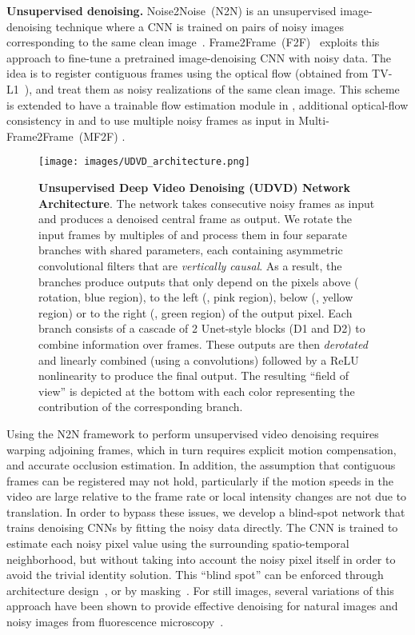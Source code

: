 \documentclass[final]{cvpr}
\begin{document}
\noindent \textbf{Unsupervised denoising.} Noise2Noise~(N2N) is an unsupervised image-denoising technique where a CNN is trained on pairs of noisy images corresponding to the same clean image~\cite{n2n}. Frame2Frame~(F2F)~\cite{f2f} exploits this approach to fine-tune a pretrained image-denoising CNN with noisy data. The idea is to register contiguous frames using the optical flow (obtained from TV-L1~\cite{tvl1}), and treat them as noisy realizations of the same clean image. This scheme is extended to have a trainable flow estimation module in \cite{Yu_2020_CVPR_Workshops}, additional optical-flow consistency in \cite{F2F_extension} and to use multiple noisy frames as input in Multi-Frame2Frame~(MF2F) \cite{mf2f}.


\begin{figure*}[ht]
\begin{center}
    \texttt{[image: images/UDVD\_architecture.png]}
\end{center}
\caption{\textbf{Unsupervised Deep Video Denoising (UDVD) Network Architecture}. The network takes  consecutive noisy frames as input and produces a denoised central frame as output. We rotate the input frames by multiples of  and process them in four separate branches with shared parameters, each containing asymmetric convolutional filters that are \emph{vertically causal}. As a result, the branches produce outputs that only depend on the pixels above ( rotation, blue region), to the left (, pink region), below (, yellow region) or to the right (, green region) of the output pixel. 
Each branch consists of a cascade of 2 Unet-style blocks (D1 and D2) to combine information over frames. These outputs are then \emph{derotated} and linearly combined (using a   convolutions) followed by a ReLU nonlinearity to produce the final output. The resulting ``field of view'' is depicted at the bottom with each color representing the contribution of the corresponding branch.}
\label{fig:network_arch}
\end{figure*}


Using the N2N framework to perform unsupervised video denoising requires warping adjoining frames, which in turn requires explicit motion compensation, and accurate occlusion estimation. In addition, the assumption that contiguous frames can be registered may not hold, particularly if the motion speeds in the video are large relative to the frame rate or local intensity changes are not due to translation. In order to bypass these issues, we develop a blind-spot network that trains denoising CNNs by fitting the noisy data directly. The CNN is trained to estimate each noisy pixel value using the surrounding spatio-temporal neighborhood, but without taking into account the noisy pixel itself in order to avoid the trivial identity solution. This ``blind spot'' can be enforced through architecture design~\cite{blindspotnet}, or by masking~\cite{noise2self,n2v}. For still images, several variations of this approach have been shown to provide effective denoising for natural images and noisy images from fluorescence microscopy~\cite{pn2v, fpn2v, poissongaussian}. 
\end{document}
